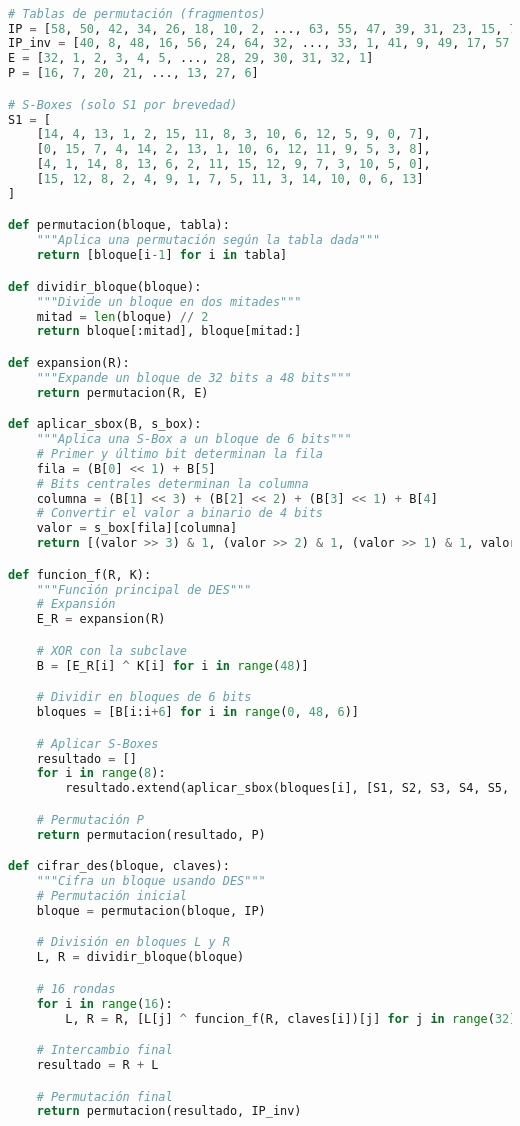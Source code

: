 \begin{lstlisting}[language=Python, caption={Fragmento de implementación de DES en Python}, label=lst:des-python]

# Tablas de permutación (fragmentos)
IP = [58, 50, 42, 34, 26, 18, 10, 2, ..., 63, 55, 47, 39, 31, 23, 15, 7]
IP_inv = [40, 8, 48, 16, 56, 24, 64, 32, ..., 33, 1, 41, 9, 49, 17, 57, 25]
E = [32, 1, 2, 3, 4, 5, ..., 28, 29, 30, 31, 32, 1]
P = [16, 7, 20, 21, ..., 13, 27, 6]

# S-Boxes (solo S1 por brevedad)
S1 = [
    [14, 4, 13, 1, 2, 15, 11, 8, 3, 10, 6, 12, 5, 9, 0, 7],
    [0, 15, 7, 4, 14, 2, 13, 1, 10, 6, 12, 11, 9, 5, 3, 8],
    [4, 1, 14, 8, 13, 6, 2, 11, 15, 12, 9, 7, 3, 10, 5, 0],
    [15, 12, 8, 2, 4, 9, 1, 7, 5, 11, 3, 14, 10, 0, 6, 13]
]

def permutacion(bloque, tabla):
    """Aplica una permutación según la tabla dada"""
    return [bloque[i-1] for i in tabla]

def dividir_bloque(bloque):
    """Divide un bloque en dos mitades"""
    mitad = len(bloque) // 2
    return bloque[:mitad], bloque[mitad:]

def expansion(R):
    """Expande un bloque de 32 bits a 48 bits"""
    return permutacion(R, E)

def aplicar_sbox(B, s_box):
    """Aplica una S-Box a un bloque de 6 bits"""
    # Primer y último bit determinan la fila
    fila = (B[0] << 1) + B[5]
    # Bits centrales determinan la columna
    columna = (B[1] << 3) + (B[2] << 2) + (B[3] << 1) + B[4]
    # Convertir el valor a binario de 4 bits
    valor = s_box[fila][columna]
    return [(valor >> 3) & 1, (valor >> 2) & 1, (valor >> 1) & 1, valor & 1]

def funcion_f(R, K):
    """Función principal de DES"""
    # Expansión
    E_R = expansion(R)

    # XOR con la subclave
    B = [E_R[i] ^ K[i] for i in range(48)]

    # Dividir en bloques de 6 bits
    bloques = [B[i:i+6] for i in range(0, 48, 6)]

    # Aplicar S-Boxes
    resultado = []
    for i in range(8):
        resultado.extend(aplicar_sbox(bloques[i], [S1, S2, S3, S4, S5, S6, S7, S8][i]))

    # Permutación P
    return permutacion(resultado, P)

def cifrar_des(bloque, claves):
    """Cifra un bloque usando DES"""
    # Permutación inicial
    bloque = permutacion(bloque, IP)

    # División en bloques L y R
    L, R = dividir_bloque(bloque)

    # 16 rondas
    for i in range(16):
        L, R = R, [L[j] ^ funcion_f(R, claves[i])[j] for j in range(32)]

    # Intercambio final
    resultado = R + L

    # Permutación final
    return permutacion(resultado, IP_inv)
\end{lstlisting}


